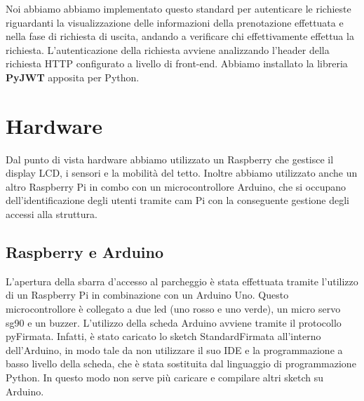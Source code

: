 \documentclass[a4paper,11pt]{report}
\begin{document}
Noi abbiamo abbiamo implementato questo standard per autenticare le richieste riguardanti la visualizzazione delle informazioni della prenotazione effettuata e nella fase di richiesta di uscita, andando a verificare chi effettivamente effettua la richiesta. L'autenticazione della richiesta avviene analizzando l'header della richiesta HTTP configurato a livello di front-end. Abbiamo installato la libreria \textbf{PyJWT} apposita per Python.

\chapter{Hardware}
Dal punto di vista hardware abbiamo utilizzato un Raspberry che gestisce il display LCD, i sensori e la mobilità del tetto. Inoltre abbiamo utilizzato anche un altro Raspberry Pi in combo con un microcontrollore Arduino, che si occupano dell'identificazione degli utenti tramite cam Pi con la conseguente gestione degli accessi alla struttura.
\section{Raspberry e Arduino}
L’apertura della sbarra d'accesso al parcheggio è stata effettuata tramite l’utilizzo di un Raspberry Pi in combinazione con un Arduino Uno. Questo microcontrollore è collegato a due led (uno rosso e uno verde), un micro servo sg90 e un buzzer.
L’utilizzo della scheda Arduino avviene tramite il protocollo pyFirmata.
Infatti, è stato caricato lo sketch StandardFirmata all’interno dell’Arduino, in modo tale da non utilizzare il suo IDE e la programmazione a basso livello della scheda, che è stata sostituita dal linguaggio di programmazione Python. In questo modo non serve più caricare e compilare altri sketch su Arduino.
\end{document}

